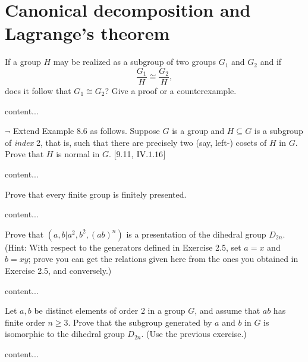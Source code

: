 \section{Canonical decomposition and Lagrange's theorem}
\extitle

\begin{exercise}
	If a group $H$ may be realized as a subgroup of two groups $G_1$ and $G_2$ and if 
	\[
		\frac{G_1}{H} \cong \frac{G_2}{H},
	\]
	does it follow that $G_1 \cong G_2$? Give a proof or a counterexample.
\end{exercise}
\begin{solution}
	content...
\end{solution}

\begin{exercise}
	$\neg$ Extend Example 8.6 as follows. Suppose $G$ is a group and $H\subseteq G$ is a subgroup of \emph{index} 2, that is, such that there are precisely two (say, left-) cosets of $H$ in $G$. Prove that $H$ is normal in $G$. [9.11, $\RNo{4}.1.16$]
\end{exercise}
\begin{solution}
	content...
\end{solution}

\begin{exercise}
	Prove that every finite group is finitely presented.
\end{exercise}
\begin{solution}
	content...
\end{solution}

\begin{exercise}
	Prove that $(a,b|a^2,b^2,(ab)^n)$ is a presentation of the dihedral group $D_{2n}$. (Hint: With respect to the generators defined in Exercise 2.5, set $a = x$ and $b = xy$; prove you can get the relations given here from the ones you obtained in Exercise 2.5, and conversely.)
\end{exercise}
\begin{solution}
	content...
\end{solution}

\begin{exercise}
	Let $a,b$ be distinct elements of order 2 in a group $G$, and assume that $ab$ has finite order $n\geq 3$. Prove that the subgroup generated by $a$ and $b$ in $G$ is isomorphic to the dihedral group $D_{2n}$. (Use the previous exercise.)
\end{exercise}
\begin{solution}
	content...
\end{solution}

